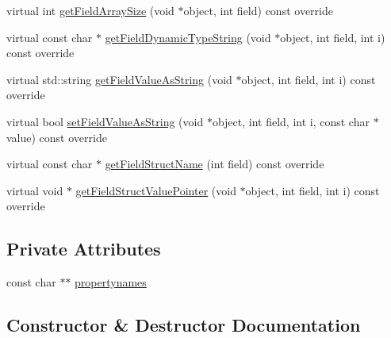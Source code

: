\begin{DoxyCompactItemize}
\item 
virtual int \hyperlink{classAppMsgFalseDepDescriptor_a179d2851182b7e2c778befc442640361}{get\+Field\+Array\+Size} (void $\ast$object, int field) const override
\item 
virtual const char $\ast$ \hyperlink{classAppMsgFalseDepDescriptor_a18f649fae5364f7b9f326fd1ae9afb6d}{get\+Field\+Dynamic\+Type\+String} (void $\ast$object, int field, int i) const override
\item 
virtual std\+::string \hyperlink{classAppMsgFalseDepDescriptor_ac9b26b1e9c849df0e0259dfa3a38885c}{get\+Field\+Value\+As\+String} (void $\ast$object, int field, int i) const override
\item 
virtual bool \hyperlink{classAppMsgFalseDepDescriptor_ad7f784c5c9c941292342602674c4b9e4}{set\+Field\+Value\+As\+String} (void $\ast$object, int field, int i, const char $\ast$value) const override
\item 
virtual const char $\ast$ \hyperlink{classAppMsgFalseDepDescriptor_aa44a321c042bf2af6eff2f92ad52f73d}{get\+Field\+Struct\+Name} (int field) const override
\item 
virtual void $\ast$ \hyperlink{classAppMsgFalseDepDescriptor_a2975e01f5455360c1954f722dfce0924}{get\+Field\+Struct\+Value\+Pointer} (void $\ast$object, int field, int i) const override
\end{DoxyCompactItemize}
\subsection*{Private Attributes}
\begin{DoxyCompactItemize}
\item 
const char $\ast$$\ast$ \hyperlink{classAppMsgFalseDepDescriptor_a9ae1f3f2f3bd0f3647643894402add0b}{propertynames}
\end{DoxyCompactItemize}


\subsection{Constructor \& Destructor Documentation}
\mbox{\label{classAppMsgFalseDepDescriptor_a4ca99cc9f908534f473db357ba25ff2d}} 
